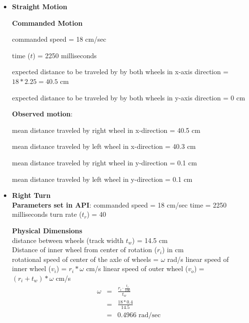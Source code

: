 \begin{itemize}
	\item \textbf{Straight Motion}
	
	\textbf{Commanded Motion}
	
	commanded speed = 18 cm/sec
	
	time ($t$) = 2250 milliseconds
	
	expected distance to be traveled by by both wheels in x-axis direction = $ 18 * 2.25 = 40.5$ cm 
	
	expected distance to be traveled by by both wheels in y-axis direction = $0$ cm
	
	
	\textbf{Observed motion}:
	
	mean distance traveled by right wheel in x-direction = 40.5 cm
	
	mean distance traveled by left wheel in x-direction = 40.3 cm 
	
	mean distance traveled by right wheel in y-direction = 0.1 cm 
	
	mean distance traveled by left wheel in y-direction = 0.1 cm 
	
	\item \textbf{Right Turn} \\
	\textbf{Parameters set in API}: \newline
	commanded speed = 18 cm/sec \newline
	time = 2250 milliseconds \newline
	turn rate ($t_r$) = 40 \newline
	
	\textbf{Physical Dimensions} \\
	distance between wheels (track width $t_w$) = 14.5 cm \\
	
	Distance of inner wheel from center of rotation ($r_i$) in cm \\ 
	rotational speed of center of the axle of wheels = $\omega$ rad/s \newline
	linear speed of inner wheel ($v_i$) = $r_i * \omega$ cm/s \newline
	linear speed of outer wheel ($v_o$) = $(r_i + t_w ) * \omega$ cm/s \newline
\begin{equation}
\begin{array}{rcl}
\omega &=& \frac{r_i \cdot \frac{t_r}{100}}{t_w} \\
 &=& \frac{18 * 0.4}{14.5} \\
 &=& 0.4966 \text{ rad/sec}
\end{array}
\end{equation}


\end{itemize}
